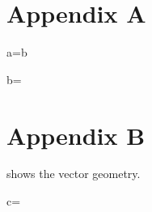 \appendix
\section{Appendix A}
\beq
a=b
\eeq

\beq
b=\sqrt{\epsilon}
\eeq


\appendix
\section{Appendix B}

 shows the vector geometry.

\beq
c=
\eeq
